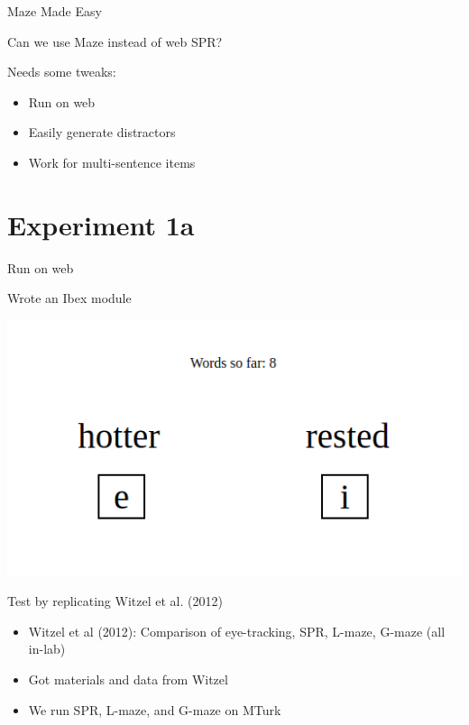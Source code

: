\documentclass[12pt, xcolor=beamer,table,usenames,dvipsnames, ignorenonframetext, ngerman]{beamer}
\begin{document}
\begin{frame}{Maze Made Easy}
	
	Can we use Maze instead of web SPR?\pause
	
	\medskip
	
	Needs some tweaks:\pause
	\begin{itemize}
		\item Run on web \pause
		\item Easily generate distractors \pause
		\item Work for multi-sentence items
	\end{itemize} 
	
\end{frame}

\section{Experiment 1a}
\begin{frame}{Run on web}
	
	\pause
	Wrote an Ibex module \pause
	
	\begin{center}\includegraphics[width=.7\textwidth]{../Images/screenshot.png} \end{center}\pause
	

Test by replicating Witzel et al. (2012)
\begin{itemize}
	\item Witzel et al (2012): Comparison of eye-tracking, SPR, L-maze, G-maze (all in-lab)
	\item Got materials and data from Witzel
	\item We run SPR, L-maze, and G-maze on MTurk
\end{itemize}
\end{frame}
\end{document}
